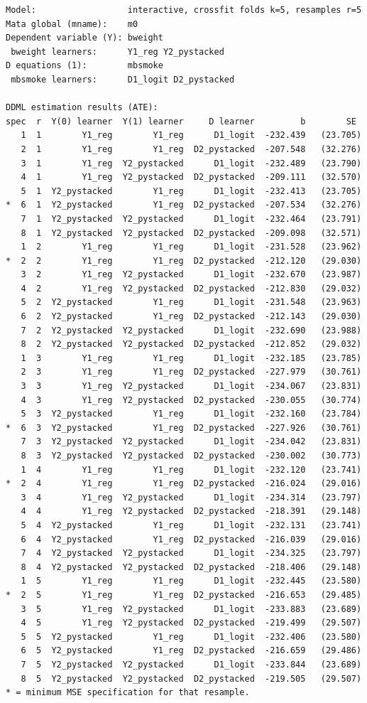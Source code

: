 \documentclass[
]{book}
\begin{document}
\begin{verbatim}
Model:                  interactive, crossfit folds k=5, resamples r=5
Mata global (mname):    m0
Dependent variable (Y): bweight
 bweight learners:      Y1_reg Y2_pystacked
D equations (1):        mbsmoke
 mbsmoke learners:      D1_logit D2_pystacked

DDML estimation results (ATE):
spec  r  Y(0) learner  Y(1) learner     D learner         b        SE 
   1  1        Y1_reg        Y1_reg      D1_logit  -232.439   (23.705)
   2  1        Y1_reg        Y1_reg  D2_pystacked  -207.548   (32.276)
   3  1        Y1_reg  Y2_pystacked      D1_logit  -232.489   (23.790)
   4  1        Y1_reg  Y2_pystacked  D2_pystacked  -209.111   (32.570)
   5  1  Y2_pystacked        Y1_reg      D1_logit  -232.413   (23.705)
*  6  1  Y2_pystacked        Y1_reg  D2_pystacked  -207.534   (32.276)
   7  1  Y2_pystacked  Y2_pystacked      D1_logit  -232.464   (23.791)
   8  1  Y2_pystacked  Y2_pystacked  D2_pystacked  -209.098   (32.571)
   1  2        Y1_reg        Y1_reg      D1_logit  -231.528   (23.962)
*  2  2        Y1_reg        Y1_reg  D2_pystacked  -212.120   (29.030)
   3  2        Y1_reg  Y2_pystacked      D1_logit  -232.670   (23.987)
   4  2        Y1_reg  Y2_pystacked  D2_pystacked  -212.830   (29.032)
   5  2  Y2_pystacked        Y1_reg      D1_logit  -231.548   (23.963)
   6  2  Y2_pystacked        Y1_reg  D2_pystacked  -212.143   (29.030)
   7  2  Y2_pystacked  Y2_pystacked      D1_logit  -232.690   (23.988)
   8  2  Y2_pystacked  Y2_pystacked  D2_pystacked  -212.852   (29.032)
   1  3        Y1_reg        Y1_reg      D1_logit  -232.185   (23.785)
   2  3        Y1_reg        Y1_reg  D2_pystacked  -227.979   (30.761)
   3  3        Y1_reg  Y2_pystacked      D1_logit  -234.067   (23.831)
   4  3        Y1_reg  Y2_pystacked  D2_pystacked  -230.055   (30.774)
   5  3  Y2_pystacked        Y1_reg      D1_logit  -232.160   (23.784)
*  6  3  Y2_pystacked        Y1_reg  D2_pystacked  -227.926   (30.761)
   7  3  Y2_pystacked  Y2_pystacked      D1_logit  -234.042   (23.831)
   8  3  Y2_pystacked  Y2_pystacked  D2_pystacked  -230.002   (30.773)
   1  4        Y1_reg        Y1_reg      D1_logit  -232.120   (23.741)
*  2  4        Y1_reg        Y1_reg  D2_pystacked  -216.024   (29.016)
   3  4        Y1_reg  Y2_pystacked      D1_logit  -234.314   (23.797)
   4  4        Y1_reg  Y2_pystacked  D2_pystacked  -218.391   (29.148)
   5  4  Y2_pystacked        Y1_reg      D1_logit  -232.131   (23.741)
   6  4  Y2_pystacked        Y1_reg  D2_pystacked  -216.039   (29.016)
   7  4  Y2_pystacked  Y2_pystacked      D1_logit  -234.325   (23.797)
   8  4  Y2_pystacked  Y2_pystacked  D2_pystacked  -218.406   (29.148)
   1  5        Y1_reg        Y1_reg      D1_logit  -232.445   (23.580)
*  2  5        Y1_reg        Y1_reg  D2_pystacked  -216.653   (29.485)
   3  5        Y1_reg  Y2_pystacked      D1_logit  -233.883   (23.689)
   4  5        Y1_reg  Y2_pystacked  D2_pystacked  -219.499   (29.507)
   5  5  Y2_pystacked        Y1_reg      D1_logit  -232.406   (23.580)
   6  5  Y2_pystacked        Y1_reg  D2_pystacked  -216.659   (29.486)
   7  5  Y2_pystacked  Y2_pystacked      D1_logit  -233.844   (23.689)
   8  5  Y2_pystacked  Y2_pystacked  D2_pystacked  -219.505   (29.507)
* = minimum MSE specification for that resample.


\end{verbatim}
\end{document}
